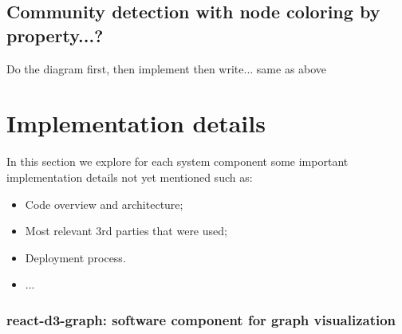 \subsection{Community detection with node coloring by property...?}
\begin{huge}
Do the diagram first, then implement then write... same as above
\end{huge}

\section{Implementation details}
In this section we explore for each system component some important implementation details not yet mentioned such as:
\begin{itemize}
    \item Code overview and architecture;
    \item Most relevant 3rd parties that were used;
    \item Deployment process.
    \item ...
\end{itemize}


%
\subsubsection{react-d3-graph: software component for graph visualization}


